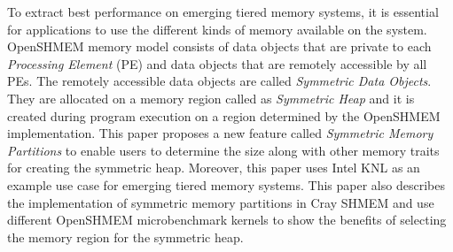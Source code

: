 To extract best performance on emerging tiered memory systems,
it is essential for applications to use the different kinds of
memory available on the system. OpenSHMEM memory model consists of
data objects that are private to each \emph{Processing Element}
(PE) and data objects that are remotely accessible by all PEs. The
remotely accessible data objects are called \emph{Symmetric Data
Objects}. They are allocated on a memory region called as
\emph{Symmetric Heap} and it is created during program execution
on a region determined by the OpenSHMEM implementation. This paper
proposes a new feature called \emph{Symmetric Memory Partitions} to
enable users to determine the size along with other memory traits
for creating the symmetric heap. Moreover, this paper uses Intel KNL
as an example use case for emerging tiered memory systems. This paper
also describes the implementation of symmetric memory partitions in
Cray SHMEM and use different OpenSHMEM microbenchmark kernels to
show the benefits of selecting the memory region for the symmetric
heap.

